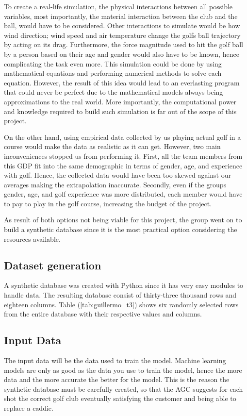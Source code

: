 \documentclass[11pt,landscape]{article}
\begin{document}
\begin{multicols}{3}
To create a real-life simulation, the physical interactions between all possible
variables, most importantly, the material interaction between the club and the
ball, would have to be considered. Other interactions to simulate would be how
wind direction; wind speed and air temperature change the golfs ball trajectory
by acting on its drag. Furthermore, the force magnitude used to hit the golf
ball by a person based on their age and gender would also have to be known,
hence complicating the task even more. This simulation could be done by using
mathematical equations and performing numerical methods to solve each equation.
However, the result of this idea would lead to an everlasting program that could
never be perfect due to the mathematical models always being approximations to
the real world. More importantly, the computational power and knowledge required
to build such simulation is far out of the scope of this project. 

On the other hand, using empirical data collected by us playing actual golf in a
course would make the data as realistic as it can get. However, two main
inconveniences stopped us from performing it. First, all the team members from
this GDP fit into the same demographic in terms of gender, age, and experience
with golf. Hence, the collected data would have been too skewed against our
averages making the extrapolation inaccurate. Secondly, even if the groups
gender, age, and golf experience was more distributed, each member would have to
pay to play in the golf course, increasing the budget of the project.

As result of both options not being viable for this project, the group went on
to build a synthetic database since it is the most practical option considering
the resources available.

\subsection{Dataset generation}
A synthetic database was created with Python since it has very easy modules to
handle data. The resulting database consist of thirty-three thousand rows and
eighteen columns. Table (\ref{tab:guillermo_t3}) shows six randomly selected rows from the entire
database with their respective values and columns.

\subsection{Input Data}
The input data will be the data used to train the model. Machine learning models
are only as good as the data you use to train the model, hence the more data and
the more accurate the better for the model. This is the reason the synthetic
database must be carefully created, so that the AGC suggests for each shot the
correct golf club eventually satisfying the customer and being able to replace a
caddie.


\end{multicols}
\end{document}
